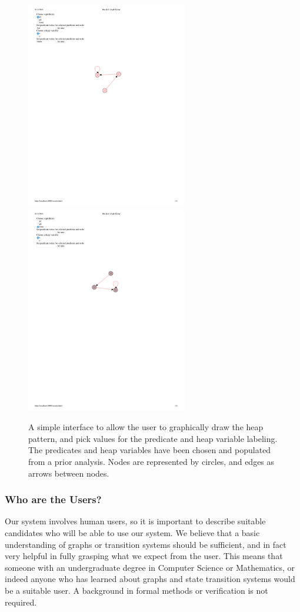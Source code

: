 \begin{figure}
  \centering
  \includegraphics[width=7cm]{fig/predicate-heapvar-val.pdf}
  \includegraphics[width=7cm]{fig/basic-graph.pdf}
  \caption{A simple interface to allow the user to graphically draw the heap pattern, and pick values for the predicate and heap variable labeling. The predicates and heap variables have been chosen and populated from a prior analysis. Nodes are represented by circles, and edges as arrows between nodes.
  }
  \label{fig:basic-graph-interface}
\end{figure}

\subsubsection{Who are the Users?}
\label{sec:who-are-the-users}
Our system involves human users, so it is important to describe suitable candidates who
will be able to use our system. We believe that a basic understanding of graphs or
transition systems should be sufficient, and in fact very helpful in fully grasping what
we expect from the user. This means that someone with an undergraduate degree in
Computer Science or Mathematics, or indeed anyone who has learned about graphs and state
transition systems would be a suitable user. A background in formal methods or
verification is not required.

